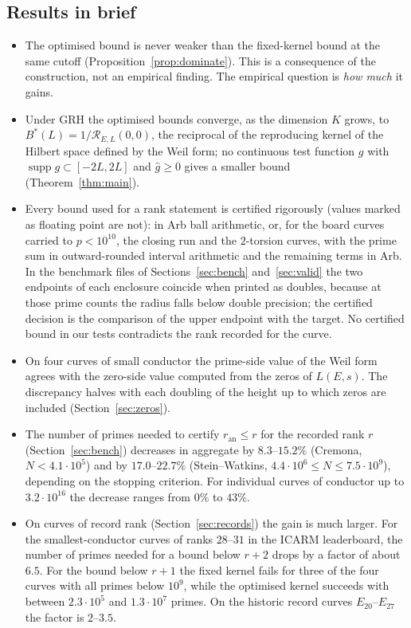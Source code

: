 \documentclass[11pt]{amsart}
\theoremstyle{remark}
\theoremstyle{definition}
\newcommand{\Rad}{\mathcal{R}_{E,L}}
\newcommand{\ran}{r_{\mathrm{an}}}
\DeclareMathOperator{\supp}{supp}
\begin{document}
\subsection*{Results in brief}
\begin{itemize}
\item The optimised bound is never weaker than the fixed-kernel bound at the same cutoff (Proposition~\ref{prop:dominate}). This is a consequence of the construction, not an empirical finding. The empirical question is \emph{how much} it gains.
\item Under GRH the optimised bounds converge, as the dimension $K$ grows, to $B^*(L)=1/\Rad(0,0)$, the reciprocal of the reproducing kernel of the Hilbert space defined by the Weil form; no continuous test function $g$ with $\supp g\subset[-2L,2L]$ and $\hat g\ge0$ gives a smaller bound (Theorem~\ref{thm:main}).
\item Every bound used for a rank statement is certified rigorously (values marked as floating point are not): in Arb ball arithmetic, or, for the board curves carried to $p<10^{10}$, the closing run and the $2$-torsion curves, with the prime sum in outward-rounded interval arithmetic and the remaining terms in Arb. In
the benchmark files of Sections~\ref{sec:bench} and~\ref{sec:valid} the two endpoints of each
enclosure coincide when printed as doubles, because at those prime counts the radius falls below
double precision; the certified decision is the comparison of the upper endpoint with the target. No certified bound in our tests contradicts the rank recorded for the curve.
\item On four curves of small conductor the prime-side value of the Weil form agrees with the zero-side value computed from the zeros of $L(E,s)$. The discrepancy halves with each doubling of the height up to which zeros are included (Section~\ref{sec:zeros}).
\item The number of primes needed to certify $\ran\le r$ for the recorded rank $r$ (Section~\ref{sec:bench}) decreases in aggregate by $8.3$--$15.2\%$ (Cremona, $N<4.1\cdot 10^5$) and by $17.0$--$22.7\%$ (Stein--Watkins, $4.4\cdot10^6\le N\le 7.5\cdot 10^9$), depending on the stopping criterion. For individual curves of conductor up to $3.2\cdot 10^{16}$ the decrease ranges from $0\%$ to $43\%$.
\item On curves of record rank (Section~\ref{sec:records}) the gain is much larger. For the smallest-conductor curves of ranks $28$--$31$ in the ICARM leaderboard, the number of primes needed for a bound below $r+2$ drops by a factor of about $6.5$. For the bound below $r+1$ the fixed kernel fails for three of the four curves with all primes below $10^9$, while the optimised kernel succeeds with between $2.3\cdot10^5$ and $1.3\cdot10^7$ primes. On the historic record curves $E_{20}$--$E_{27}$ the factor is $2$--$3.5$.

\end{itemize}
\end{document}
